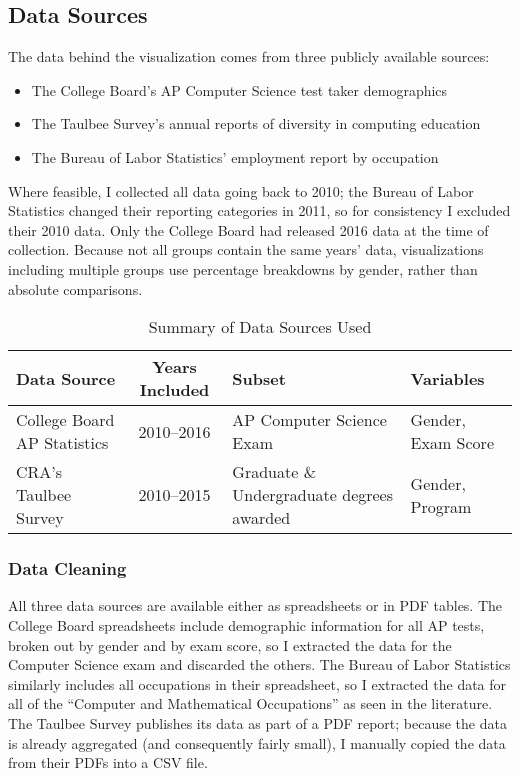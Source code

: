 \subsection{Data Sources}\label{data}
The data behind the visualization comes from three publicly available sources:
\begin{itemize}
  \item The College Board's AP Computer Science test taker demographics
  \item The Taulbee Survey's annual reports of diversity in computing education
  \item The Bureau of Labor Statistics' employment report by occupation
\end{itemize}

Where feasible, I collected all data going back to 2010; the Bureau of Labor Statistics changed their reporting categories in 2011, so for consistency I excluded their 2010 data. Only the College Board had released 2016 data at the time of collection. Because not all groups contain the same years' data, visualizations including multiple groups use percentage breakdowns by gender, rather than absolute comparisons.

\begin{table}
  \caption{Summary of Data Sources Used}
  \label{tbl:data-sources}
  \begin{tabular}{L{3cm}cL{4.5cm}l} \hline
    \textbf{Data Source} & \textbf{Years Included} & \textbf{Subset} & \textbf{Variables} \\ \hline
    College Board AP Statistics & 2010--2016 & AP Computer Science Exam & Gender, Exam Score \\
    CRA's Taulbee Survey & 2010--2015 & Graduate \& Undergraduate degrees awarded & Gender, Program \\
  \end{tabular}

\end{table}

\subsubsection{Data Cleaning}
All three data sources are available either as spreadsheets or in PDF tables. The College Board spreadsheets include demographic information for all AP tests, broken out by gender and by exam score, so I extracted the data for the Computer Science exam and discarded the others. The Bureau of Labor Statistics similarly includes all occupations in their spreadsheet, so I extracted the data for all of the ``Computer and Mathematical Occupations'' as seen in the literature. The Taulbee Survey publishes its data as part of a PDF report; because the data is already aggregated (and consequently fairly small), I manually copied the data from their PDFs into a CSV file.

